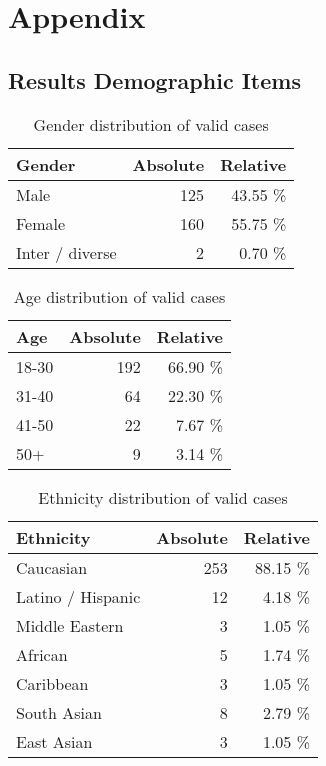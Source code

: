 \section{Appendix}


\subsection{Results Demographic Items}

\begin{table}[H]
	\centering
	\begin{tabular}{l|rr}
		\textbf{Gender} & \textbf{Absolute} & \textbf{Relative} \\ \midrule
		Male & 125 & 43.55 \%\\
		Female & 160 & 55.75 \%\\
		Inter / diverse & 2 & 0.70 \%\\ \bottomrule
	\end{tabular}
	\caption{Gender distribution of valid cases}
\end{table}

\begin{table}[H]
	\centering
	\begin{tabular}{l|rr}
		\textbf{Age} & \textbf{Absolute} & \textbf{Relative} \\ \midrule
		18-30 & 192 & 66.90 \%\\
		31-40 & 64 & 22.30 \%\\
		41-50 & 22 & 7.67 \%\\ 
		50+   & 9 & 3.14 \%\\ \bottomrule
	\end{tabular}
	\caption{Age distribution of valid cases}
\end{table}


\begin{table}[H]
	\centering
	\begin{tabular}{l|rr}
		\textbf{Ethnicity} & \textbf{Absolute} & \textbf{Relative} \\ \midrule
		Caucasian 			& 253 & 88.15 \%\\
		Latino / Hispanic 	& 12 & 4.18 \%\\
		Middle Eastern 		& 3 & 1.05 \%\\ 
		African 			& 5 & 1.74 \%\\ 
		Caribbean 			& 3 & 1.05 \%\\ 
		South Asian 		& 8 & 2.79 \%\\ 
		East Asian 			& 3 & 1.05 \%\\ \bottomrule
	\end{tabular}
	\caption{Ethnicity distribution of valid cases}
\end{table}


